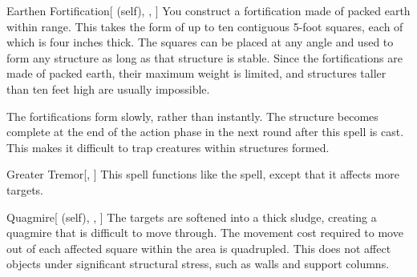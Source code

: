 \lowercase{\hypertarget{spell:Earthen Fortification}{}}\label{spell:Earthen Fortification}
\begin{attuneability}[\nth{3}]{\hypertarget{spell:Earthen Fortification}{Earthen Fortification}}[ (self), , ]
\targetrule
You construct a fortification made of packed earth within \rngmed range.
This takes the form of up to ten contiguous 5-foot squares, each of which is four inches thick.
The squares can be placed at any angle and used to form any structure as long as that structure is stable.
Since the fortifications are made of packed earth, their maximum weight is limited, and structures taller than ten feet high are usually impossible.

The fortifications form slowly, rather than instantly.
The structure becomes complete at the end of the action phase in the next round after this spell is cast.
This makes it difficult to trap creatures within structures formed.
\end{attuneability}
\vspace{0.25em}



\lowercase{\hypertarget{spell:Greater Tremor}{}}\label{spell:Greater Tremor}
\begin{freeability}[\nth{3}]{\hypertarget{spell:Greater Tremor}{Greater Tremor}}[, ]
This spell functions like the  spell, except that it affects more targets.
\end{freeability}
\vspace{0.25em}



\lowercase{\hypertarget{spell:Quagmire}{}}\label{spell:Quagmire}
\begin{attuneability}[\nth{3}]{\hypertarget{spell:Quagmire}{Quagmire}}[ (self), , ]
The targets are softened into a thick sludge, creating a quagmire that is difficult to move through.
The movement cost required to move out of each affected square within the area is quadrupled.
This does not affect objects under significant structural stress, such as walls and support columns.
\end{attuneability}
\vspace{0.25em}



